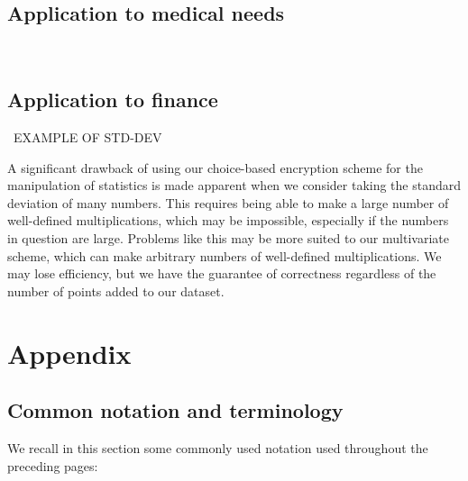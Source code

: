 \documentclass[11pt]{report}
\begin{document}
\section{Application to medical needs}

\

\section{Application to finance}

\ EXAMPLE OF STD-DEV

A significant drawback of using our choice-based encryption scheme for the manipulation of statistics is made apparent when we consider taking the standard deviation of many numbers. This requires being able to make a large number of well-defined multiplications, which may be impossible, especially if the numbers in question are large. Problems like this may be more suited to our multivariate scheme, which can make arbitrary numbers of well-defined multiplications. We may lose efficiency, but we have the guarantee of correctness regardless of the number of points added to our dataset.

\chapter{Appendix}

\section{Common notation and terminology}

We recall in this section some commonly used notation used throughout the preceding pages:
\end{document}
